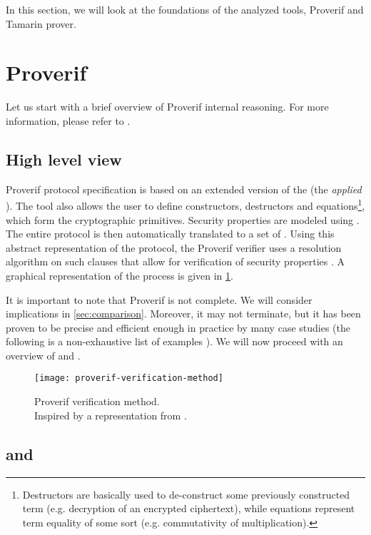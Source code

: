 In this section, we will look at the foundations of the analyzed tools, Proverif and Tamarin prover.


\section{Proverif}
Let us start with a brief overview of Proverif internal reasoning. For more information, please refer to \cite{SymbolicComputationalBlanchet, SymbolicVerificationBlanchet, ProverifManual}.

\subsection{High level view}
Proverif protocol specification is based on an extended version of the \pic{} (the \textit{applied} \pic{}). The tool also allows the user to define constructors, destructors and equations\footnote{Destructors are basically used to de-construct some previously constructed term (e.g. decryption of an encrypted ciphertext), while equations represent term equality of some sort (e.g. commutativity of multiplication).}, which form the cryptographic primitives. Security properties are modeled using \Horncs{}. The entire protocol is then automatically translated to a set of \Horncs{}. Using this abstract representation of the protocol, the Proverif verifier uses a resolution algorithm on such clauses that allow for verification of security properties \cite{SymbolicComputationalBlanchet}.
A graphical representation of the process is given in \cref{fig:proverif-verification-method}.

It is important to note that Proverif is not complete. We will consider implications in \cref{sec:comparison}. Moreover, it may not terminate, but it has been proven to be precise and efficient enough in practice by many case studies (the following is a non-exhaustive list of examples \cite{10.1145/1266977.1266978, ABADI20053, MTProto2-Proverif, hal-01575923}).
We will now proceed with an overview of \pic{} and \Horncs{}.

\begin{figure}[t]
    \texttt{[image: proverif-verification-method]}
    \centering
    \caption{Proverif verification method.\\Inspired by a representation from \BLANC{} \cite{SymbolicComputationalBlanchet}.}
    \label{fig:proverif-verification-method}
\end{figure}

\subsection{\pic{} and \apic{}}
\label{subsec:pic-apic}

